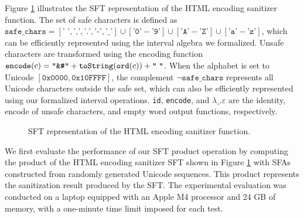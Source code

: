 Figure \ref{fig:html-sanitizer-sft} illustrates the SFT representation of the HTML encoding sanitizer function.
 The set of safe characters is defined as $\texttt{safe\_chars} = [\texttt{' '}, \texttt{','}, \texttt{'.'}, \texttt{'-'}, \texttt{'\_'}] \cup [\texttt{'0'}-\texttt{'9'}] \cup [\texttt{'A'}-\texttt{'Z'}] \cup [\texttt{'a'}-\texttt{'z'}]$, which can be efficiently represented using the interval algebra we formalized. Unsafe characters are transformed using the encoding function $\texttt{encode}(c) = \texttt{``\&\#''} + \texttt{toString}(\texttt{ord}(c)) + \texttt{``\;''}$. When the alphabet is set to Unicode $[\mathtt{0x0000}, \mathtt{0x10FFFF}]$, the complement $\neg\texttt{safe\_chars}$ represents all Unicode characters outside the safe set, which can also be efficiently represented using our formalized interval operations. \texttt{id}, \texttt{encode}, and $\lambda \_.\varepsilon$ are the identity, encode of unsafe characters, and empty word output functions, respectively.
\begin{figure}[htbp]
\centering
{}
\caption{SFT representation of the HTML encoding sanitizer function.}
\label{fig:html-sanitizer-sft}
\end{figure}

We first evaluate the performance of our SFT product operation by computing the product of the HTML encoding sanitizer SFT shown in Figure \ref{fig:html-sanitizer-sft} with SFAs constructed from randomly generated Unicode sequences. This product represents the sanitization result produced by the SFT. The experimental evaluation was conducted on a laptop equipped with an Apple M4 processor and 24 GB of memory, with a one-minute time limit imposed for each test.



